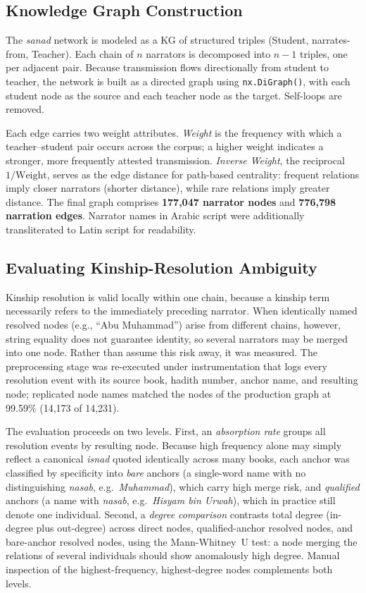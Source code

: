 \documentclass[conference]{IEEEtran}
\begin{document}
\subsection{Knowledge Graph Construction}

The \textit{sanad} network is modeled as a KG of structured triples
(Student, narrates-from, Teacher). Each chain of $n$ narrators is decomposed into
$n-1$ triples, one per adjacent pair. Because transmission flows directionally
from student to teacher, the network is built as a directed graph using
\texttt{nx.DiGraph()}, with each student node as the source and each teacher node
as the target. Self-loops are removed.

Each edge carries two weight attributes. \textit{Weight} is the frequency with
which a teacher--student pair occurs across the corpus; a higher weight indicates
a stronger, more frequently attested transmission. \textit{Inverse Weight}, the
reciprocal $1/\text{Weight}$, serves as the edge distance for path-based
centrality: frequent relations imply closer narrators (shorter distance), while
rare relations imply greater distance. The final graph comprises
\textbf{177{,}047 narrator nodes} and \textbf{776{,}798 narration edges}.
Narrator names in Arabic script were additionally transliterated to Latin script
for readability.

\subsection{Evaluating Kinship-Resolution Ambiguity}
\label{sec:m-kinship}

Kinship resolution is valid locally within one chain, because a kinship term
necessarily refers to the immediately preceding narrator. When identically named
resolved nodes (e.g., ``Abu Muhammad'') arise from different chains, however,
string equality does not guarantee identity, so several narrators may be merged
into one node. Rather than assume this risk away, it was measured. The
preprocessing stage was re-executed under instrumentation that logs every
resolution event with its source book, hadith number, anchor name, and resulting
node; replicated node names matched the nodes of the production graph at 99.59\%
(14{,}173 of 14{,}231).

The evaluation proceeds on two levels. First, an \emph{absorption rate} groups all
resolution events by resulting node. Because high frequency alone may simply
reflect a canonical \textit{isnad} quoted identically across many books, each
anchor was classified by specificity into \emph{bare} anchors (a single-word name
with no distinguishing \textit{nasab}, e.g.\ \textit{Muhammad}), which carry high
merge risk, and \emph{qualified} anchors (a name with \textit{nasab}, e.g.\
\textit{Hisyam bin Urwah}), which in practice still denote one individual. Second,
a \emph{degree comparison} contrasts total degree (in-degree plus out-degree)
across direct nodes, qualified-anchor resolved nodes, and bare-anchor resolved
nodes, using the Mann-Whitney~U test: a node merging the relations of several
individuals should show anomalously high degree. Manual inspection of the
highest-frequency, highest-degree nodes complements both levels.
\end{document}
